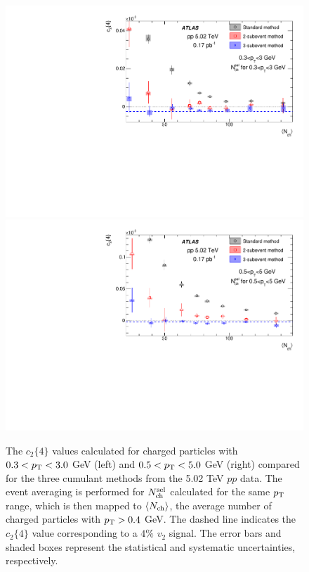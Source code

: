 \begin{figure}[H]
\centering
\includegraphics[width=.475\linewidth]{figs/chapter_subcumu/ATLAS_c24_pp5_pT0}
\includegraphics[width=.475\linewidth]{figs/chapter_subcumu/ATLAS_c24_pp5_pT1}
\caption{The $c_2\{4\}$ values calculated for charged particles with $0.3<p_\text{T}<3.0$ GeV (left) and $0.5<p_\text{T}<5.0$ GeV (right) compared for the three cumulant methods from the 5.02 TeV $pp$ data. The event averaging is performed for $N_\text{ch}^\text{sel}$ calculated for the same $p_\text{T}$ range, which is then mapped to $\left\langle N_\text{ch}\right\rangle$, the average number of charged particles with $p_\text{T}>0.4$ GeV. The dashed line indicates the $c_2\{4\}$ value corresponding to a $4\%$ $v_2$ signal. The error bars and shaded boxes represent the statistical and systematic uncertainties, respectively.}
\label{fig:subcumu_ATLAS_c24_pp5}
\end{figure}

